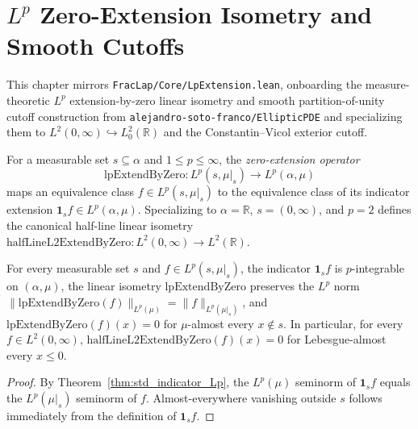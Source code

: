 \chapter{$L^p$ Zero-Extension Isometry and Smooth Cutoffs}

This chapter mirrors \texttt{FracLap/Core/LpExtension.lean}, onboarding the measure-theoretic $L^p$ extension-by-zero linear isometry and smooth partition-of-unity cutoff construction from \texttt{alejandro-soto-franco/EllipticPDE} and specializing them to $L^2(0, \infty) \hookrightarrow L^2_0(\mathbb{R})$ and the Constantin--Vicol exterior cutoff.

\begin{definition}\label{def:lp_extend_by_zero}
\leanok
For a measurable set $s \subseteq \alpha$ and $1 \le p \le \infty$, the \emph{zero-extension operator}
\[
  \mathrm{lpExtendByZero} : L^p(s, \mu|_s) \to L^p(\alpha, \mu)
\]
maps an equivalence class $f \in L^p(s, \mu|_s)$ to the equivalence class of its indicator extension $\mathbf{1}_s f \in L^p(\alpha, \mu)$. Specializing to $\alpha = \mathbb{R}$, $s = (0, \infty)$, and $p = 2$ defines the canonical half-line linear isometry $\mathrm{halfLineL2ExtendByZero} : L^2(0, \infty) \to L^2(\mathbb{R})$.
\end{definition}

\begin{theorem}\label{thm:lp_extend_by_zero_properties}
\leanok
For every measurable set $s$ and $f \in L^p(s, \mu|_s)$, the indicator $\mathbf{1}_s f$ is $p$-integrable on $(\alpha, \mu)$, the linear isometry $\mathrm{lpExtendByZero}$ preserves the $L^p$ norm $\lVert \mathrm{lpExtendByZero}(f) \rVert_{L^p(\mu)} = \lVert f \rVert_{L^p(\mu|_s)}$, and $\mathrm{lpExtendByZero}(f)(x) = 0$ for $\mu$-almost every $x \notin s$. In particular, for every $f \in L^2(0, \infty)$, $\mathrm{halfLineL2ExtendByZero}(f)(x) = 0$ for Lebesgue-almost every $x \le 0$.
\end{theorem}

\begin{proof}
\leanok
By Theorem~\ref{thm:std_indicator_Lp}, the $L^p(\mu)$ seminorm of $\mathbf{1}_s f$ equals the $L^p(\mu|_s)$ seminorm of $f$. Almost-everywhere vanishing outside $s$ follows immediately from the definition of $\mathbf{1}_s f$.
\end{proof}

